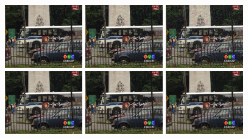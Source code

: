 \documentclass{llncs}
\begin{document}
\begin{figure}[thpb!]
	\begin{center}
		\includegraphics[trim=0cm 2cm 4cm 1cm, clip=true, width=0.3\textwidth]{figs/bus_nisy_s10_044.png}
		\includegraphics[trim=0cm 2cm 4cm 1cm, clip=true, width=0.3\textwidth]{figs/bus_nisy_s20_044.png}
		\includegraphics[trim=0cm 2cm 4cm 1cm, clip=true, width=0.3\textwidth]{figs/bus_nisy_s40_044.png}\\
		\includegraphics[trim=0cm 2cm 4cm 1cm, clip=true, width=0.3\textwidth]{figs/bus_vnlb_s10_tr2_044.png}
		\includegraphics[trim=0cm 2cm 4cm 1cm, clip=true, width=0.3\textwidth]{figs/bus_vnlb_s20_tr2_044.png}
		\includegraphics[trim=0cm 2cm 4cm 1cm, clip=true, width=0.3\textwidth]{figs/bus_vnlb_s40_tr2_044.png}\\

\end{center}
\end{figure}
\end{document}
